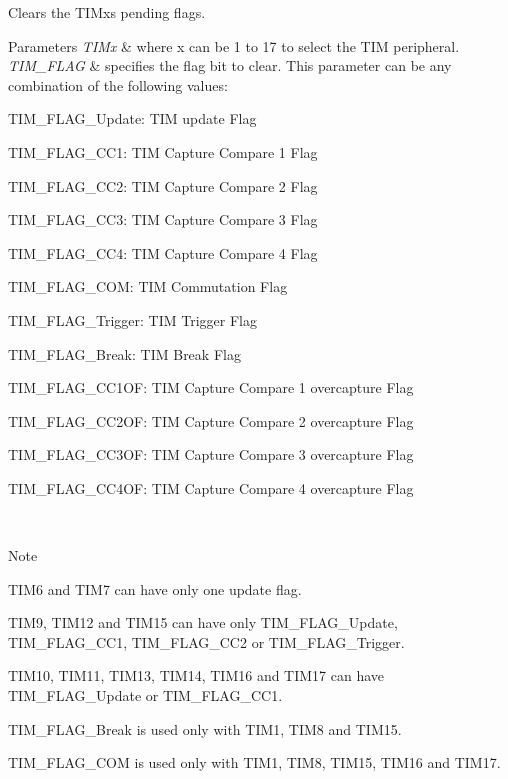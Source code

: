 Clears the T\+I\+Mx\textquotesingle{}s pending flags. 


\begin{DoxyParams}{Parameters}
{\em T\+I\+Mx} & where x can be 1 to 17 to select the T\+IM peripheral. \\
\hline
{\em T\+I\+M\+\_\+\+F\+L\+AG} & specifies the flag bit to clear. This parameter can be any combination of the following values\+: \begin{DoxyItemize}
\item T\+I\+M\+\_\+\+F\+L\+A\+G\+\_\+\+Update\+: T\+IM update Flag \item T\+I\+M\+\_\+\+F\+L\+A\+G\+\_\+\+C\+C1\+: T\+IM Capture Compare 1 Flag \item T\+I\+M\+\_\+\+F\+L\+A\+G\+\_\+\+C\+C2\+: T\+IM Capture Compare 2 Flag \item T\+I\+M\+\_\+\+F\+L\+A\+G\+\_\+\+C\+C3\+: T\+IM Capture Compare 3 Flag \item T\+I\+M\+\_\+\+F\+L\+A\+G\+\_\+\+C\+C4\+: T\+IM Capture Compare 4 Flag \item T\+I\+M\+\_\+\+F\+L\+A\+G\+\_\+\+C\+OM\+: T\+IM Commutation Flag \item T\+I\+M\+\_\+\+F\+L\+A\+G\+\_\+\+Trigger\+: T\+IM Trigger Flag \item T\+I\+M\+\_\+\+F\+L\+A\+G\+\_\+\+Break\+: T\+IM Break Flag \item T\+I\+M\+\_\+\+F\+L\+A\+G\+\_\+\+C\+C1\+OF\+: T\+IM Capture Compare 1 overcapture Flag \item T\+I\+M\+\_\+\+F\+L\+A\+G\+\_\+\+C\+C2\+OF\+: T\+IM Capture Compare 2 overcapture Flag \item T\+I\+M\+\_\+\+F\+L\+A\+G\+\_\+\+C\+C3\+OF\+: T\+IM Capture Compare 3 overcapture Flag \item T\+I\+M\+\_\+\+F\+L\+A\+G\+\_\+\+C\+C4\+OF\+: T\+IM Capture Compare 4 overcapture Flag \end{DoxyItemize}
\\
\hline
\end{DoxyParams}
\begin{DoxyNote}{Note}

\begin{DoxyItemize}
\item T\+I\+M6 and T\+I\+M7 can have only one update flag.
\item T\+I\+M9, T\+I\+M12 and T\+I\+M15 can have only T\+I\+M\+\_\+\+F\+L\+A\+G\+\_\+\+Update, T\+I\+M\+\_\+\+F\+L\+A\+G\+\_\+\+C\+C1, T\+I\+M\+\_\+\+F\+L\+A\+G\+\_\+\+C\+C2 or T\+I\+M\+\_\+\+F\+L\+A\+G\+\_\+\+Trigger.
\item T\+I\+M10, T\+I\+M11, T\+I\+M13, T\+I\+M14, T\+I\+M16 and T\+I\+M17 can have T\+I\+M\+\_\+\+F\+L\+A\+G\+\_\+\+Update or T\+I\+M\+\_\+\+F\+L\+A\+G\+\_\+\+C\+C1.
\item T\+I\+M\+\_\+\+F\+L\+A\+G\+\_\+\+Break is used only with T\+I\+M1, T\+I\+M8 and T\+I\+M15.
\item T\+I\+M\+\_\+\+F\+L\+A\+G\+\_\+\+C\+OM is used only with T\+I\+M1, T\+I\+M8, T\+I\+M15, T\+I\+M16 and T\+I\+M17. 
\end{DoxyItemize}
\end{DoxyNote}

